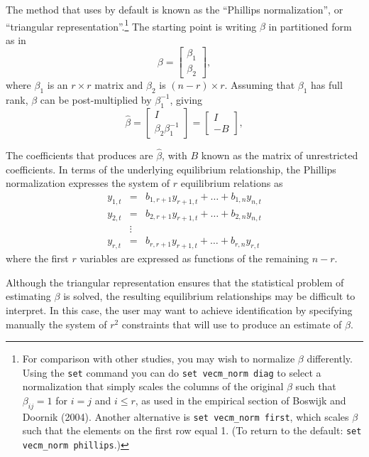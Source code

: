 The method that  uses by default is known as the ``Phillips
normalization'', or ``triangular representation''.\footnote{For
  comparison with other studies, you may wish to normalize $\beta$
  differently.  Using the \texttt{set} command you can do 
  \verb|set vecm_norm diag| to select a normalization that simply scales the
  columns of the original $\beta$ such that $\beta_{ij} = 1$ for $i=j$
  and $i \leq r$, as used in the empirical section of Boswijk and
  Doornik (2004).  Another alternative is \verb+set vecm_norm first+,
  which scales $\beta$ such that the elements on the first row equal
  1.  (To return to the default: \texttt{set vecm\_norm phillips}.)
} The starting point is writing $\beta$ in partitioned form as in
\[
  \beta = \left[
    \begin{array}{c} \beta_1 \\ \beta_2  \end{array}
    \right] ,
\]
where $\beta_1$ is an $r \times r$ matrix and  $\beta_2$ is $(n-r)
\times r$. Assuming that $\beta_1$ has full rank, $\beta$ can be
post-multiplied by $\beta_1^{-1}$, giving
\[
  \hat{\beta} = \left[
    \begin{array}{c} I \\ \beta_2 \beta_1^{-1}  \end{array}
    \right] =
    \left[
    \begin{array}{c} I \\ -B \end{array}
  \right]  ,
\]

The coefficients that  produces are $\hat{\beta}$, with
$B$ known as the matrix of unrestricted coefficients. In
terms of the underlying equilibrium relationship, the Phillips
normalization expresses the system of $r$ equilibrium relations as
  \begin{eqnarray}
    y_{1,t} & = & b_{1,r+1} y_{r+1,t} + \ldots + b_{1,n} y_{n,t} \\
    y_{2,t} & = & b_{2,r+1} y_{r+1,t} + \ldots + b_{2,n} y_{n,t} \\
    & \vdots & \\
    y_{r,t} & = & b_{r,r+1} y_{r+1,t} + \ldots + b_{r,n} y_{r,t} 
  \end{eqnarray}
where the first $r$ variables are expressed as functions of the
remaining $n-r$.

Although the triangular representation ensures that the statistical
problem of estimating $\beta$ is solved, the resulting equilibrium
relationships may be difficult to interpret. In this case, the user
may want to achieve identification by specifying manually the system
of $r^2$ constraints that  will use to produce an estimate
of $\beta$.


